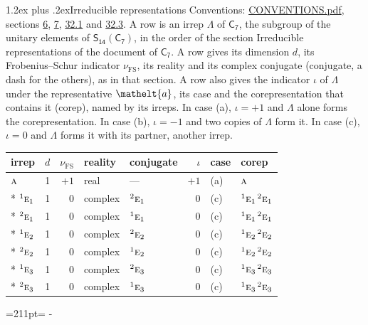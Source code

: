 \documentclass[10pt,a4paper]{article}
\makeatletter
\renewcommand\section{\@startsection{section}{1}{\z@}{-3ex plus -1ex minus -.2ex}%
  {1.2ex plus .2ex}{\normalfont\large\sffamily\bfseries\color{parttitle}}}
\newcommand{\needspace}[1]{\par\penalty-100\begingroup\dimen0=#1\relax\dimen2=\pagegoal
  \advance\dimen2-\pagetotal\ifdim\dimen0>\dimen2\relax\ifdim\dimen2>0pt\vfil\break\fi\fi
  \endgroup}
\numberwithin{equation}{section}
\newcommand{\eltfont}[1]{{\let\sigma\eltsigma\mathelt{#1}}}
\newcommand{\grp}[1]{\mathsf{#1}}
\newcommand{\irr}[1]{\text{\normalfont\scshape #1}}
\newcommand{\conjpair}[1]{{}^{#1}}
\newcommand{\elt}[1]{\eltfont{#1}}
\newcommand{\fsind}{\nu_{\mathrm{FS}}}
\makeatother
\begin{document}
\section{Irreducible representations}\label{s:irreps}
Conventions: \href{../../CONVENTIONS.pdf}{CONVENTIONS.pdf}, sections \href{../../../rotation/CONVENTIONS.pdf\#conv.6}{6}, \href{../../../rotation/CONVENTIONS.pdf\#conv.7}{7}, \href{../../CONVENTIONS.pdf\#conv.32.1}{32.1} and \href{../../CONVENTIONS.pdf\#conv.32.3}{32.3}.
\leavevmode\label{n:irrep.Delta}A row is an irrep $\Lambda$ of $\grp{C_{7}}$, the subgroup of the unitary elements of $\grp{S_{14}}(\grp{C_{7}})$, in the order of the section Irreducible representations of the document of \href{../../../rotation/data/pdf/C7.pdf}{$\grp{C_{7}}$}. \label{n:index.dimension}\label{n:index.frobenius}\label{n:head.irrep}\label{n:head.reality}\label{n:head.conjugate}A row gives its dimension $d$, its Frobenius--Schur indicator $\fsind$, its reality and its complex conjugate (conjugate, a dash for the others), as in that section. \label{n:head.case.corep}\label{n:head.corep}A row also gives the indicator $\iota$ of $\Lambda$ under the representative $\elt{a}$, its case and the corepresentation that contains it (corep), named by its irreps. In case (a), $\iota = +1$ and $\Lambda$ alone forms the corepresentation. In case (b), $\iota = -1$ and two copies of $\Lambda$ form it. In case (c), $\iota = 0$ and $\Lambda$ forms it with its partner, another irrep.
\setlength{\emergencystretch}{2em}\par\setlength{\emergencystretch}{0pt}
{\small\renewcommand{\arraystretch}{1.25}\setlength{\tabcolsep}{4pt}\begin{longtable}{@{}lrrllrll@{}}\toprule
irrep & $d$ & $\fsind$ & reality & conjugate & $\iota$ & case & corep\\\midrule\endhead
\bottomrule\endfoot\endlastfoot
$\irr{a}$ & 1 & $+1$ & real & --- & $+1$ & (a) & $\irr{a}$\\*
$\conjpair{1}\irr{e}_{1}$ & 1 & $0$ & complex & $\conjpair{2}\irr{e}_{1}$ & $0$ & (c) & $\conjpair{1}\irr{e}_{1}\,\conjpair{2}\irr{e}_{1}$\\*
$\conjpair{2}\irr{e}_{1}$ & 1 & $0$ & complex & $\conjpair{1}\irr{e}_{1}$ & $0$ & (c) & $\conjpair{1}\irr{e}_{1}\,\conjpair{2}\irr{e}_{1}$\\*
$\conjpair{1}\irr{e}_{2}$ & 1 & $0$ & complex & $\conjpair{2}\irr{e}_{2}$ & $0$ & (c) & $\conjpair{1}\irr{e}_{2}\,\conjpair{2}\irr{e}_{2}$\\*
$\conjpair{2}\irr{e}_{2}$ & 1 & $0$ & complex & $\conjpair{1}\irr{e}_{2}$ & $0$ & (c) & $\conjpair{1}\irr{e}_{2}\,\conjpair{2}\irr{e}_{2}$\\*
$\conjpair{1}\irr{e}_{3}$ & 1 & $0$ & complex & $\conjpair{2}\irr{e}_{3}$ & $0$ & (c) & $\conjpair{1}\irr{e}_{3}\,\conjpair{2}\irr{e}_{3}$\\*
$\conjpair{2}\irr{e}_{3}$ & 1 & $0$ & complex & $\conjpair{1}\irr{e}_{3}$ & $0$ & (c) & $\conjpair{1}\irr{e}_{3}\,\conjpair{2}\irr{e}_{3}$\\
\bottomrule\end{longtable}}
\needspace{211pt}
\end{document}
